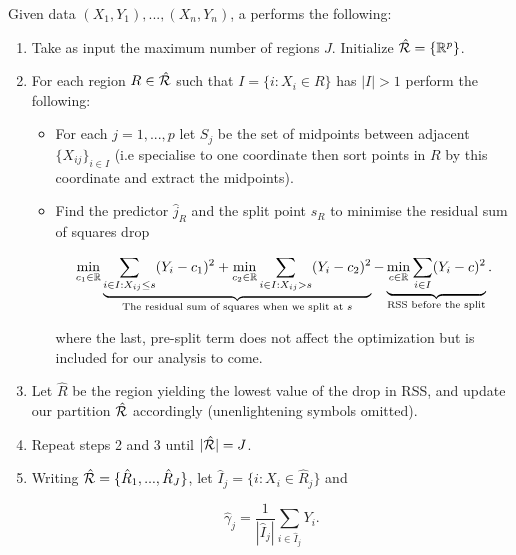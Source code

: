 \documentclass[11pt]{scrartcl}
\begin{document}
\begin{definition}
Given data $(X_1, Y_1), ... , (X_n, Y_n)$, a  performs the following:

\begin{enumerate}
    \item Take as input the maximum number of regions $J$. Initialize $\hat{\mathcal{R}} = \{ \mathbb R^p \}$.
    
    \item For each region $R \in \hat{\mathcal{R}}$ such that $I = \{ i : X_i \in R \}$ has $|I| > 1$ perform the following:
    
    \begin{itemize}
            \item For each $j = 1, ... , p$ let $S_j$ be the set of midpoints between adjacent $\{ X_{ij} \}_{i \in I}$ (i.e specialise to one coordinate then sort points in $R$ by this coordinate and extract the midpoints).
            
            \item Find the predictor $\hat{j}_R$ and the split point $\hat{s}_R$ to minimise the residual sum of squares drop
            
            \begin{equation}
                \min_{c_1 \in \mathbb R} \underbrace{\sum_{i \in I : X_{ij} \le s} (Y_i - c_1)^2 + \min_{c_2 \in \mathbb R} \sum_{i \in I : X_{ij} > s} (Y_i - c_2)^2 }_{\text{The residual sum of squares when we split at $s$}} - \underbrace{\min_{c \in \mathbb R} \sum_{i \in I} (Y_i - c)^2}_{\text{RSS before the split}}.
            \label{RSS drop}
            \end{equation}
            
            where the last, pre-split term does not affect the optimization but is included for our analysis to come.
    \end{itemize}

\item Let $\hat{R}$ be the region yielding the lowest value of the drop in RSS, and update our partition $\hat{\mathcal{R}}$ accordingly (unenlightening symbols omitted).

\item Repeat steps 2 and 3 until $|\hat{\mathcal{R}}|=J$.

\item Writing $\hat{\mathcal{R}} = \{ \hat{R}_1, ... , \hat{R}_J \}$, let $\hat{I}_j = \{ i : X_i \in \hat{R}_j \}$ and 

\begin{equation}
    \hat{\gamma}_j = \frac{1}{|\hat{I}_j|} \sum_{i \in \hat{I}_j} Y_i.
\end{equation}


\end{enumerate}
\end{definition}
\end{document}
